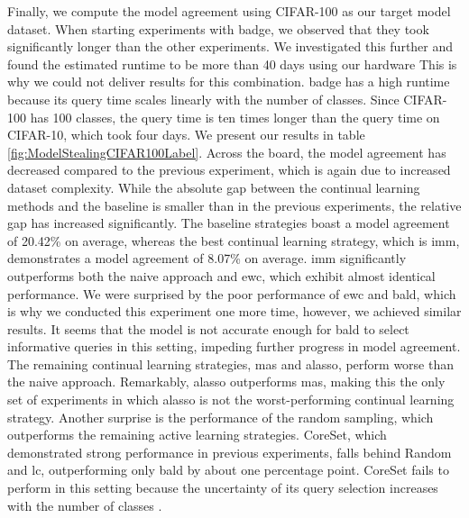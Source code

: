 Finally, we compute the model agreement using CIFAR-100 as our target model dataset. When starting experiments with \gls{badge}, we observed that they
took significantly longer than the other experiments. We investigated this further and found the estimated runtime to be more than 40 days using our hardware
This is why we could not deliver results for this combination.  \gls{badge} has a high runtime because its query time scales linearly with the number of classes. Since
CIFAR-100 has 100 classes, the query time is ten times longer than the query time on CIFAR-10, which took four days. We present our results in table 
\ref{fig:ModelStealingCIFAR100Label}. Across the board, the model agreement has decreased compared to the previous experiment, which is again due to increased dataset
complexity. While the absolute gap between the continual learning methods and the baseline is smaller than in the previous experiments, the relative gap has increased
significantly. The baseline strategies boast a model agreement of 20.42\% on average, whereas the best continual learning strategy, which is \gls{imm}, demonstrates a
model agreement of 8.07\% on average. \gls{imm} significantly outperforms both the naive approach and \gls{ewc}, which exhibit almost identical performance. We were surprised
by the poor performance of \gls{ewc} and \gls{bald}, which is why we conducted this experiment one more time, however, we achieved similar results. It seems that the model is
not accurate enough for \gls{bald} to select informative queries in this setting, impeding further progress in model agreement. The remaining
continual learning strategies, \gls{mas} and \gls{alasso}, perform worse than the naive approach. Remarkably, \gls{alasso} outperforms \gls{mas}, making this the
only set of experiments in which \gls{alasso} is not the worst-performing continual learning strategy. Another surprise is the performance of the random sampling,
which outperforms the remaining active learning strategies. CoreSet, which demonstrated strong performance in previous experiments, falls behind
Random and \gls{lc}, outperforming only \gls{bald} by about one percentage point. CoreSet fails to perform in this setting because the uncertainty of its query
selection increases with the number of classes \cite{sener2017active}. \par

